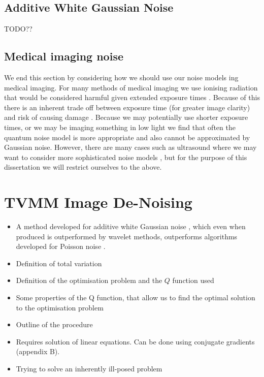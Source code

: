 \documentclass[12pt,twoside,notitlepage]{report}
\begin{document}
        \subsection{Additive White Gaussian Noise}
            TODO??

        \subsection{Medical imaging noise}
            We end this section by considering how we should use our noise models ing medical imaging. For many methods 
            of medical imaging we use ionising radiation that would be considered harmful given extended exposure times 
            \cite{picano2004sustainability}. Because of this there is an inherent trade off between exposure time (for 
            greater image clarity) and risk of causing damage \cite{sprawls1987physical}. Because we may potentially 
            use shorter exposure times, or we may be imaging something in low light we find that often the quantum noise 
            model is more appropriate and also cannot be approximated by Gaussian noise. However, there are many cases 
            such as ultrasound where we may want to consider more sophisticated noise models \cite{coupe2009nonlocal}, 
            but for the purpose of this dissertation we will restrict ourselves to the above.








    \section{TVMM Image De-Noising}
        \begin{framed}
        \begin{itemize}
            \item A method developed for additive white Gaussian noise \cite{figueiredo2006total}, which even when produced 
                is outperformed by wavelet methods, outperforms algorithms developed for Poisson noise \cite{rodrigues2008denoising}.
            \item Definition of total variation
            \item Definition of the optimisation problem and the $Q$ function used
            \item Some properties of the Q function, that allow us to find the optimal solution to the optimisation problem
            \item Outline of the procedure
            \item Requires solution of linear equations. Can be done using conjugate gradients (appendix B).
            \item Trying to solve an inherently ill-posed problem
        \end{itemize}
        \end{framed}
\end{document}
